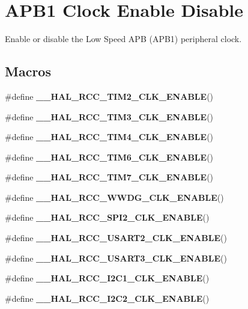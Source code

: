 \hypertarget{group___r_c_c___a_p_b1___clock___enable___disable}{\section{A\-P\-B1 Clock Enable Disable}
\label{group___r_c_c___a_p_b1___clock___enable___disable}
}


Enable or disable the Low Speed A\-P\-B (A\-P\-B1) peripheral clock.  


\subsection*{Macros}
\begin{DoxyCompactItemize}
\item 
\#define {\bfseries \-\_\-\-\_\-\-H\-A\-L\-\_\-\-R\-C\-C\-\_\-\-T\-I\-M2\-\_\-\-C\-L\-K\-\_\-\-E\-N\-A\-B\-L\-E}()
\item 
\#define {\bfseries \-\_\-\-\_\-\-H\-A\-L\-\_\-\-R\-C\-C\-\_\-\-T\-I\-M3\-\_\-\-C\-L\-K\-\_\-\-E\-N\-A\-B\-L\-E}()
\item 
\#define {\bfseries \-\_\-\-\_\-\-H\-A\-L\-\_\-\-R\-C\-C\-\_\-\-T\-I\-M4\-\_\-\-C\-L\-K\-\_\-\-E\-N\-A\-B\-L\-E}()
\item 
\#define {\bfseries \-\_\-\-\_\-\-H\-A\-L\-\_\-\-R\-C\-C\-\_\-\-T\-I\-M6\-\_\-\-C\-L\-K\-\_\-\-E\-N\-A\-B\-L\-E}()
\item 
\#define {\bfseries \-\_\-\-\_\-\-H\-A\-L\-\_\-\-R\-C\-C\-\_\-\-T\-I\-M7\-\_\-\-C\-L\-K\-\_\-\-E\-N\-A\-B\-L\-E}()
\item 
\#define {\bfseries \-\_\-\-\_\-\-H\-A\-L\-\_\-\-R\-C\-C\-\_\-\-W\-W\-D\-G\-\_\-\-C\-L\-K\-\_\-\-E\-N\-A\-B\-L\-E}()
\item 
\#define {\bfseries \-\_\-\-\_\-\-H\-A\-L\-\_\-\-R\-C\-C\-\_\-\-S\-P\-I2\-\_\-\-C\-L\-K\-\_\-\-E\-N\-A\-B\-L\-E}()
\item 
\#define {\bfseries \-\_\-\-\_\-\-H\-A\-L\-\_\-\-R\-C\-C\-\_\-\-U\-S\-A\-R\-T2\-\_\-\-C\-L\-K\-\_\-\-E\-N\-A\-B\-L\-E}()
\item 
\#define {\bfseries \-\_\-\-\_\-\-H\-A\-L\-\_\-\-R\-C\-C\-\_\-\-U\-S\-A\-R\-T3\-\_\-\-C\-L\-K\-\_\-\-E\-N\-A\-B\-L\-E}()
\item 
\#define {\bfseries \-\_\-\-\_\-\-H\-A\-L\-\_\-\-R\-C\-C\-\_\-\-I2\-C1\-\_\-\-C\-L\-K\-\_\-\-E\-N\-A\-B\-L\-E}()
\item 
\#define {\bfseries \-\_\-\-\_\-\-H\-A\-L\-\_\-\-R\-C\-C\-\_\-\-I2\-C2\-\_\-\-C\-L\-K\-\_\-\-E\-N\-A\-B\-L\-E}()
\item 

\end{DoxyCompactItemize}
